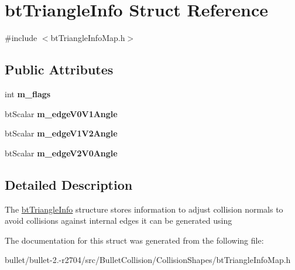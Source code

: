 \hypertarget{structbt_triangle_info}{\section{bt\+Triangle\+Info Struct Reference}
\label{structbt_triangle_info}
}


{\ttfamily \#include $<$bt\+Triangle\+Info\+Map.\+h$>$}

\subsection*{Public Attributes}
\begin{DoxyCompactItemize}
\item 
\hypertarget{structbt_triangle_info_afbd8bd1ca46ae8f3563350dce237655e}{int {\bfseries m\+\_\+flags}}\label{structbt_triangle_info_afbd8bd1ca46ae8f3563350dce237655e}

\item 
\hypertarget{structbt_triangle_info_a92d65aefb4f0c0a376a03d65a9c0606d}{bt\+Scalar {\bfseries m\+\_\+edge\+V0\+V1\+Angle}}\label{structbt_triangle_info_a92d65aefb4f0c0a376a03d65a9c0606d}

\item 
\hypertarget{structbt_triangle_info_af61bc2624e2aa5ea452c2b962d570436}{bt\+Scalar {\bfseries m\+\_\+edge\+V1\+V2\+Angle}}\label{structbt_triangle_info_af61bc2624e2aa5ea452c2b962d570436}

\item 
\hypertarget{structbt_triangle_info_a211d59980bc47ab7685b80507e14b1fd}{bt\+Scalar {\bfseries m\+\_\+edge\+V2\+V0\+Angle}}\label{structbt_triangle_info_a211d59980bc47ab7685b80507e14b1fd}

\end{DoxyCompactItemize}


\subsection{Detailed Description}
The \hyperlink{structbt_triangle_info}{bt\+Triangle\+Info} structure stores information to adjust collision normals to avoid collisions against internal edges it can be generated using 

The documentation for this struct was generated from the following file\+:\begin{DoxyCompactItemize}
\item 
bullet/bullet-\/2.-\/r2704/src/\+Bullet\+Collision/\+Collision\+Shapes/bt\+Triangle\+Info\+Map.\+h\end{DoxyCompactItemize}
